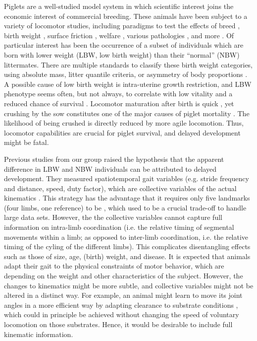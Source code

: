 Piglets are a well-studied model system in which scientific interest joins the economic interest of commercial breeding.
These animals have been subject to a variety of locomotor studies, including paradigms to test the effects of breed \citep{Mirkiani2021}, birth weight \citep{VandenHole2017,VandenHole2018,VandenHole2021}, surface friction \citep{VanWachenfelt2008}, welfare \citep{Guesgen2017}, various pathologies \citep{Abell2014,LaVallee2020,Benasson2020}, and more \citep[\textit{cf.}][]{Netukova2021}.
Of particular interest has been the occurrence of a subset of individuals which are born with lower weight (LBW, low birth weight) than their ``normal'' (NBW) littermates.
There are multiple standards to classify these birth weight categories, using absolute mass, litter quantile criteria, or asymmetry of body proportions \citep{Quiniou2002,VanTichelen2021,Wang2016,DInca2011,Feldpausch2019,Roehe2000,Amdi2013}.
A possible cause of low birth weight is intra-uterine growth restriction, and LBW phenotype seems often, but not always, to correlate with low vitality and a reduced chance of survival \citep{Baxter2008,Hales2013,Muns2013,VanGinneken2022}.
Locomotor maturation after birth is quick \citep{Andersen2016,VandenHole2017}, yet crushing by the sow constitutes one of the major causes of piglet mortality \citep{Marchant2000,Edwards2015}.
The likelihood of being crushed is directly reduced by more agile locomotion.
Thus, locomotor capabilities are crucial for piglet survival, and delayed development might be fatal.

Previous studies from our group \citep{VandenHole2017,VandenHole2021} raised the hypothesis that the apparent difference in LBW and NBW individuals can be attributed to delayed development.
They measured spatiotemporal gait variables (e.g. stride frequency and distance, speed, duty factor), which are collective variables of the actual kinematics \citep[\textit{cf.}][]{Newell2021,Nishikawa2007,Aerts2000}.
This strategy has the advantage that it requires only five landmarks (four limbs, one reference) to be , which used to be a crucial trade-off to handle large data sets.
However, the the collective variables cannot capture full information on intra-limb coordination (i.e. the relative timing of segmental movements within a limb; as opposed to inter-limb coordination, i.e. the relative timing of the cyling of the different limbs).
This complicates disentangling effects such as those of size, age, (birth) weight, and disease.
It is expected that animals adapt their gait to the physical constraints of motor behavior, which are depending on the weight and other characteristics of the subject.
However, the changes to kinematics might be more subtle, and collective variables might not be altered in a distinct way.
For example, an animal might learn to move its joint angles in a more efficient way by adapting clearance to substrate conditions \citep{VanWachenfelt2008,Mielke2019}, which could in principle be achieved without changing the speed of voluntary locomotion on those substrates.
Hence, it would be desirable to include full kinematic information.


